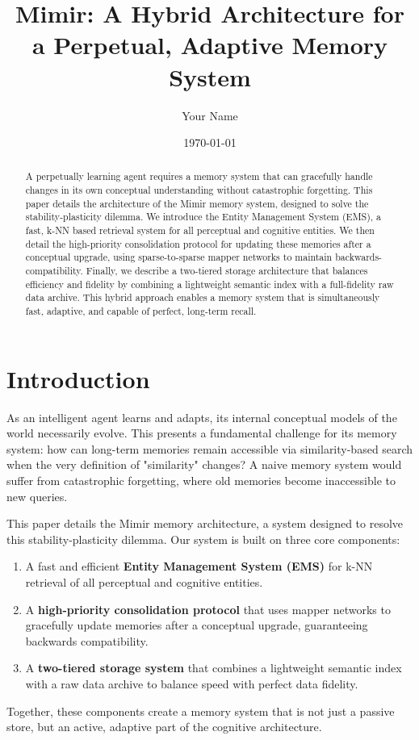 \documentclass{article}
\title{Mimir: A Hybrid Architecture for a Perpetual, Adaptive Memory System}
\author{Your Name}
\date{\today}
\begin{document}
\maketitle

\begin{abstract}
A perpetually learning agent requires a memory system that can gracefully handle changes in its own conceptual understanding without catastrophic forgetting. This paper details the architecture of the Mimir memory system, designed to solve the stability-plasticity dilemma. We introduce the Entity Management System (EMS), a fast, k-NN based retrieval system for all perceptual and cognitive entities. We then detail the high-priority consolidation protocol for updating these memories after a conceptual upgrade, using sparse-to-sparse mapper networks to maintain backwards-compatibility. Finally, we describe a two-tiered storage architecture that balances efficiency and fidelity by combining a lightweight semantic index with a full-fidelity raw data archive. This hybrid approach enables a memory system that is simultaneously fast, adaptive, and capable of perfect, long-term recall.
\end{abstract}

\section{Introduction}

As an intelligent agent learns and adapts, its internal conceptual models of the world necessarily evolve. This presents a fundamental challenge for its memory system: how can long-term memories remain accessible via similarity-based search when the very definition of "similarity" changes? A naive memory system would suffer from catastrophic forgetting, where old memories become inaccessible to new queries.

This paper details the Mimir memory architecture, a system designed to resolve this stability-plasticity dilemma. Our system is built on three core components:
\begin{enumerate}
    \item A fast and efficient \textbf{Entity Management System (EMS)} for k-NN retrieval of all perceptual and cognitive entities.
    \item A \textbf{high-priority consolidation protocol} that uses mapper networks to gracefully update memories after a conceptual upgrade, guaranteeing backwards compatibility.
    \item A \textbf{two-tiered storage system} that combines a lightweight semantic index with a raw data archive to balance speed with perfect data fidelity.
\end{enumerate}
Together, these components create a memory system that is not just a passive store, but an active, adaptive part of the cognitive architecture.
\end{document}
